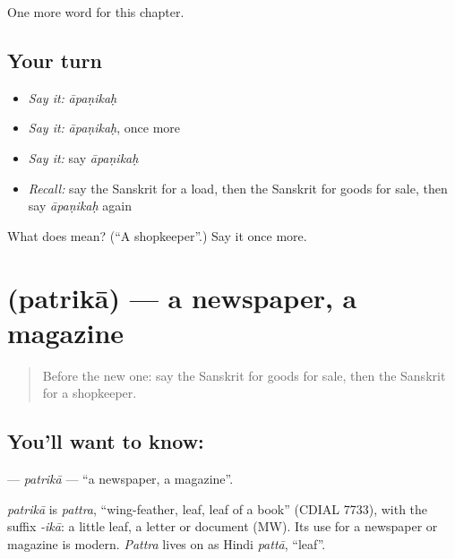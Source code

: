 \begin{grammarlens}[title={What you've built}]
One more word for this chapter.
\end{grammarlens}

\subsection*{Your turn}
\begin{itemize}
\raggedright
  \item \emph{Say it:} \emph{āpaṇikaḥ}
  \item \emph{Say it:} \emph{āpaṇikaḥ}, once more
  \item \emph{Say it:} say \emph{āpaṇikaḥ}
  \item \emph{Recall:} say the Sanskrit for a load, then the Sanskrit for goods for sale, then say \emph{āpaṇikaḥ} again
\end{itemize}

\begin{tcolorbox}[breakable,colback=teal!4,colframe=teal!35!black,title={Before you move on}]
What does  mean? (\textquotedblleft{}A shopkeeper\textquotedblright{}.) Say it once more.
\end{tcolorbox}
\section[\texorpdfstring{\sk{पत्रिका} (patrikā)}{पत्रिका (patrikā)}]{ (patrikā) — a newspaper, a magazine}

\label{lesson:SA-C222-patrika}



\begin{quote}
Before the new one: say the Sanskrit for goods for sale, then the Sanskrit for a shopkeeper.
\end{quote}

\subsection*{You'll want to know: }
\textbf{} — \emph{patrikā} — \textquotedblleft{}a newspaper, a magazine\textquotedblright{}.

\begin{cousinweb}
\emph{patrikā} is \emph{pattra}, \textquotedblleft{}wing-feather, leaf, leaf of a book\textquotedblright{} (CDIAL 7733), with the suffix \emph{-ikā}: a little leaf, a letter or document (MW). Its use for a newspaper or magazine is modern. \emph{Pattra} lives on as Hindi \emph{pattā}, \textquotedblleft{}leaf\textquotedblright{}.
\end{cousinweb}

